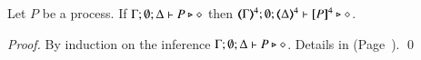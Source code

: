 \begin{proposition}\rm
	\label{prop:typepres_pHOp_to_HOp}
	Let $P$ be a \pHOp process.
	If $\Gamma; \emptyset; \Delta \vdash P \triangleright \diamond$ then 
	$\tmap{\Gamma}{4}; \emptyset; \tmap{\Delta}{4} \proves \pmap{P}{4} \hastype \Proc$. 
\end{proposition}

\begin{proof}
	By induction on the inference $\Gamma; \emptyset; \Delta \vdash P \triangleright \diamond$.
	Details in  (Page~\pageref{app:prop:typepres_pHOp_to_HOp}).
	\qed
\end{proof}


